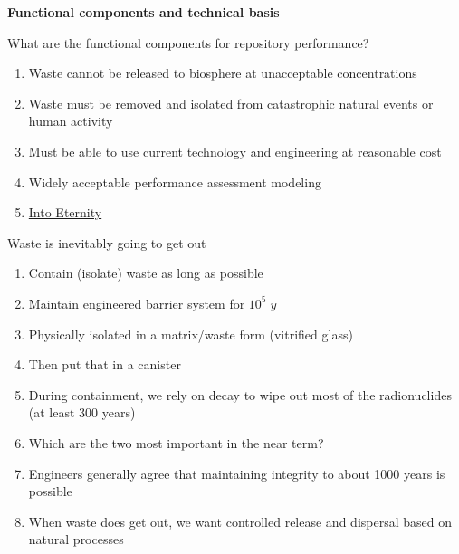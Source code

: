 \documentclass[aspectratio=1610,pdftex,dvipsnames,compress,xcolor={dvipsnames}]{beamer}
\begin{document}
\begin{frame}[plain]{}
    \centering\LARGE\textbf{Functional components and technical basis}
\end{frame}


\addtocounter{framenumber}{-1} 
\begin{frame}{What are the functional components for repository performance?}
    \begin{enumerate}[series=outerlist,topsep=0pt,itemsep=21pt,leftmargin=*,label=(\arabic*)]
        \item[]Waste cannot be released to biosphere at unacceptable concentrations
        \item[]Waste must be removed and isolated from catastrophic natural events or human activity
        \item[]Must be able to use current technology and engineering at reasonable cost
        \item[]Widely acceptable performance assessment modeling
        \item[]\href{https://youtu.be/ayLxB9fV2y4}{Into Eternity}
    \end{enumerate}
\end{frame}


\begin{frame}{Waste is inevitably going to get out}
    \begin{enumerate}[series=outerlist,topsep=0pt,itemsep=15pt,leftmargin=*,label=(\arabic*)]
        \item[]Contain (isolate) waste as long as possible
        \item[]Maintain engineered barrier system for $10^5 \; y$
        \item[]Physically isolated in a matrix/waste form (vitrified glass)
        \item[]Then put that in a canister
        \item[]During containment, we rely on decay to wipe out most of the radionuclides (at least 300 years)
        \item[]Which are the two most important in the near term?
        \item[]Engineers generally agree that maintaining integrity to about 1000 years is possible
        \item[]When waste does get out, we want controlled release and dispersal based on natural processes
    \end{enumerate}
\end{frame}
\end{document}

